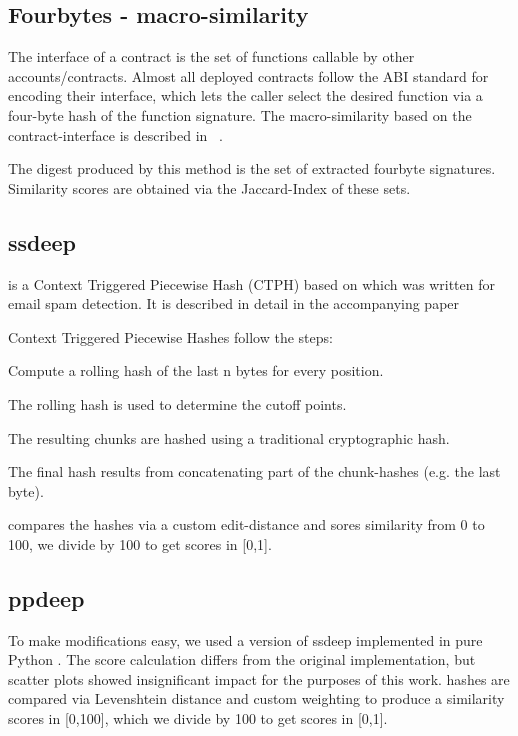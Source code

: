 \documentclass[../main.tex]{subfiles}
\begin{document}
\subsection{Fourbytes - macro-similarity \label{sec:fourbyte}}

The interface of a contract is the set of functions callable by other accounts/contracts.
Almost all deployed contracts follow the ABI standard for encoding their interface, which lets the caller select the desired function via a four-byte hash of the function signature.
The macro-similarity based on the contract-interface is described in  ~.

The digest produced by this method is the set of extracted fourbyte signatures. Similarity scores are obtained via the Jaccard-Index  of these sets.

\subsection{ssdeep \label{sec:ssdeep}}
 is a Context Triggered Piecewise Hash (CTPH) based on  which was written for email spam detection. It is described in detail in the accompanying paper 

Context Triggered Piecewise Hashes follow the steps:
\begin{ol}
  \item Compute a rolling hash of the last n bytes for every position.
  \item The rolling hash is used to determine the cutoff points.
  \item The resulting chunks are hashed using a traditional cryptographic hash.
  \item The final hash results from concatenating part of the chunk-hashes (e.g. the last byte).
\end{ol}
 compares the hashes via a custom edit-distance and sores similarity from 0 to 100, we divide by 100 to get scores in [0,1].

\subsection{ppdeep \label{sec:ppdeep}}
To make modifications easy, we used a version of ssdeep implemented in pure Python . The score calculation differs from the original implementation, but scatter plots  showed insignificant impact for the purposes of this work.  hashes are compared via Levenshtein distance  and custom weighting to produce a similarity scores in [0,100], which we divide by 100 to get scores in [0,1].
\end{document}
